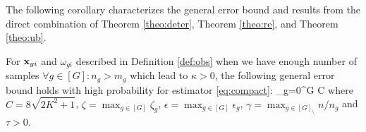 The following corollary characterizes the general error bound and results from the direct combination of Theorem \ref{theo:deter}, Theorem \ref{theo:re}, and Theorem \ref{theo:ub}.
\begin{corollary}
	\label{corr:calcub}
	For $\mathbf{x}_{gi}$ and $\omega_{gi}$ described in Definition \ref{def:obs} when we have enough number of samples $\forall g \in [G]: n_g > m_g$ which lead to $\kappa > 0$, the following general error bound holds with high probability for estimator \eqref{eq:compact}:
	{\small{}\label{eq:general}
	\sum_{g=0}^{G}  
	\leq C {\gamma} 
	\ee	}
	where $C = 8\sqrt{2 K^2 + 1}$, $\zeta = \max_{g \in [G]} \zeta_g$, $\epsilon = \max_{g \in [G]} \epsilon_g$, $\gamma = \max_{g \in [G]_{\setminus}} n/n_g$  and $\tau > 0$.
\end{corollary}



